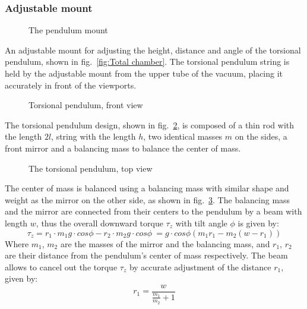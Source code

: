 \documentclass[\main/master.tex]{subfiles}
\begin{document}
\subsubsection{Adjustable mount}
\begin{figure}[htbp]
	\centering
	\caption[The pendulum mount]{The pendulum mount}
	\label{fig:mount}
\end{figure}
\FloatBarrier
\par\noindent
An adjustable mount for adjusting the height, distance and angle of the torsional pendulum, shown in fig.~\ref{fig:Total chamber}. The torsional pendulum string is held by the adjustable mount from the upper tube of the vacuum, placing it accurately in front of the viewports. 
\begin{figure}[htbp]
	\centering
	\caption[Torsional pendulum, front view]{Torsional pendulum, front view}
	\label{fig:pendulum front}
\end{figure}
\FloatBarrier
\par\noindent
The torsional pendulum design, shown in fig.~\ref{fig:pendulum front}, is composed of a thin rod with the length $2l$, string with the length $h$, two identical masses $m$ on the sides, a front mirror and a balancing mass to balance the center of mass. 
\begin{figure}[htbp]
	\centering
	\caption[The torsional pendulum, top view]{The torsional pendulum, top view}
	\label{fig:pendulum top}
\end{figure}
\FloatBarrier 
\par\noindent
The center of mass is balanced using a balancing mass with similar shape and weight as the mirror on the other side, as shown in fig.~\ref{fig:pendulum top}. The balancing mass and the mirror are connected from their centers to the pendulum by a beam with length $w$, thus the overall downward torque $\tau_z$ with tilt angle $\phi$ is given by:
\begin{equation}
\tau_z = r_1\cdot m_1 g \cdot cos\phi - r_2\cdot m_2 g \cdot cos \phi\ = g\cdot cos\phi( m_1 r_1  - m_2 (w-r_1) )    \label{eqn:downward torque}
\end{equation}
Where $m_1$, $m_2$ are the masses of the mirror and the balancing mass, and $r_1$, $r_2$ are their distance from the pendulum's center of mass respectively. The beam allows to cancel out the torque $\tau_z$ by accurate adjustment of the distance $r_1$, given by: 
\begin{equation}
 r_1 = \frac{w}{\frac{m_1}{m_2}+1}  \label{eqn:downward torque cancelled}
\end{equation}
\end{document}
